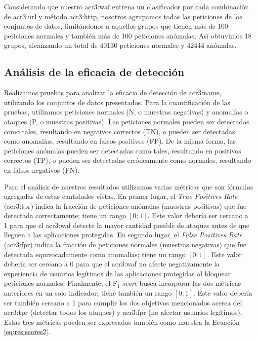 Considerando que nuestro \gls{acr3:waf} entrena un clasificador por cada
combinación de \gls{acr3:url} y método \gls{acr3:http}, nosotros agrupamos
todas las peticiones de los conjuntos de datos, limitándonos a aquellos grupos que tienen
más de 100 peticiones normales y también más de 100 peticiones anómalas.
Así obtuvimos 18 grupos, alcanzando un total de \num{40130} peticiones
normales y \num{42444} anómalas.


\subsection{Análisis de la eficacia de detección}

Realizamos pruebas para analizar la eficacia de detección de \gls{acr3:name},
utilizando los conjuntos de datos presentados. Para la cuantificación de las
pruebas, utilizamos peticiones normales (N, o muestras negativas) y
anomalías o ataques (P, o muestras positivas).
Las peticiones normales pueden ser detectadas como tales, resultando en
negativos correctos (TN), o pueden ser detectadas como anomalías, resultando
en falsos positivos (FP).
De la misma forma, las peticiones anómalas pueden ser detectadas como
tales, resultando en positivos correctos (TP), o pueden ser detectadas
erróneamente como normales, resultando en falsos negativos (FN).

Para el análisis de nuestros resultados utilizamos varias métricas que
son fórmulas agregadas de estas cantidades vistas.
En primer lugar, el \textit{True Positives Rate} (\gls{acr3:tpr})
indica la fracción de peticiones anómalas (muestras
positivas) que fue detectada correctamente; tiene un rango $[0;1]$.
Este valor debería ser cercano a 1 para que el \gls{acr3:waf} detecte
la mayor cantidad posible de ataques antes de que lleguen a las
aplicaciones protegidas.
En segundo lugar, el \textit{False Positives Rate} (\gls{acr3:fpr})
indica la fracción de peticiones normales (muestras
negativas) que fue detectada equivocadamente como anomalías; tiene
un rango $[0;1]$.
Este valor debería ser cercano a 0 para que el \gls{acr3:waf} no afecte
negativamente la experiencia de usuarios legítimos de las aplicaciones
protegidas al bloquear peticiones normales.
Finalmente, el F$_{1}$-\textit{score}
busca incorporar las dos métricas anteriores en un solo
indicador; tiene también un rango $[0;1]$.
Este valor debería ser también cercano a 1 para cumplir los dos objetivos mencionados
acerca del \gls{acr3:tpr} (detectar todos los ataques) y \gls{acr3:fpr}
(no afectar usuarios legítimos).
Estas tres métricas pueden ser expresadas también como muestra la Ecuación \ref{eq:res:scores2}.

